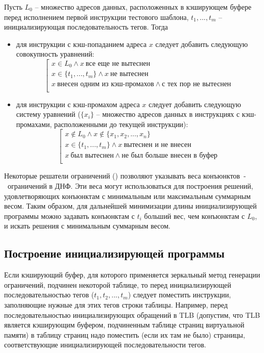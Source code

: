 \begin{utv}\label{mirror_hit_miss_human} Пусть $L_0$ -- множество
адресов данных, расположенных в кэширующем буфере перед исполнением
первой инструкции тестового шаблона, $t_1, ..., t_m$ --
инициализирующая последовательность тегов. Тогда
\begin{itemize}
\item для инструкции с кэш-попаданием адреса $x$ следует добавить
следующую совокупность уравнений:
$$
\left[
   \begin{array}{l}
    x \in L_0 \wedge x~\mbox{все еще не вытеснен} \\
    x \in \{t_1, ..., t_m\} \wedge x~\mbox{не вытеснен} \\
    x~\mbox{внесен одним из кэш-промахов} \wedge \mbox{с тех пор не вытеснен} \\
   \end{array}
  \right.
$$

\item для инструкции с кэш-промахом адреса $x$ следует добавить следующую систему
уравнений ($\{x_i\}$ -- множество адресов данных в инструкциях с
кэш-промахами, расположенными до текущей инструкции):
$$
\left[
   \begin{array}{l}
    x \notin L_0 \wedge x \notin \{x_1, x_2, ..., x_n\} \\
    x \in \{t_1, ..., t_m\} \wedge x~\mbox{вытеснен и не внесен} \\
    x~\mbox{был вытеснен} \wedge \mbox{не был больше внесен в буфер}\\
  \end{array}
\right.
$$

\end{itemize}
\end{utv}

Некоторые решатели ограничений (\cite{Z3}) позволяют указывать веса
конъюнктов~-~ограничений в ДНФ. Эти веса могут использоваться для
построения решений, удовлетворяющих конъюнктам с минимальным или
максимальным суммарным весом. Таким образом, для дальнейшей
минимизации длины инициализирующей программы можно задавать
конъюнктам с $t_i$ больший вес, чем конъюнктам с $L_0$, и искать
решения с минимальным суммарным весом.

\subsection{Построение инициализирующей программы}

Если кэширующий буфер, для которого применяется зеркальный метод
генерации ограничений, подчинен некоторой таблице, то перед
инициализирующей последовательностью тегов ($t_1, t_2, ..., t_m$)
следует поместить инструкции, заполняющие нужные для этих тегов
строки таблицы. Например, перед последовательностью инициализирующих
обращений в TLB (допустим, что TLB является кэширующим буфером,
подчиненным таблице страниц виртуальной памяти) в таблицу страниц
надо поместить (если их там не было) страницы, соответствующие
инициализирующей последовательности тегов.

